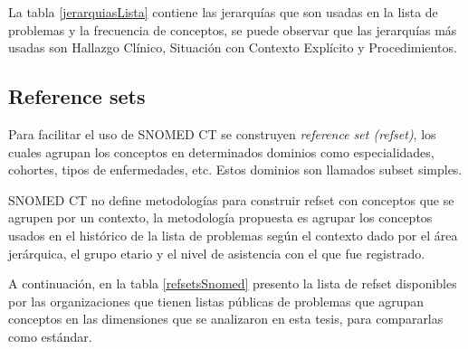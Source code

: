 La tabla \ref{jerarquiasLista} contiene las jerarquías que son usadas en la lista de problemas y la frecuencia de conceptos, se puede observar que las jerarquías más usadas son Hallazgo Clínico, Situación con Contexto Explícito y Procedimientos.

\begin{table}[htb]
\centering
\caption{Jerarquías de la lista de problemas}
\label{jerarquiasLista}
\end{table}

\subsection{Reference sets}
Para facilitar el uso de SNOMED CT se construyen \textit{reference set (refset)}, los cuales agrupan los conceptos en determinados dominios como especialidades, cohortes, tipos de enfermedades, etc. Estos dominios son llamados subset simples.

SNOMED CT no define metodologías para construir refset con conceptos que se agrupen por un contexto, la metodología propuesta es agrupar los conceptos usados en el histórico de la lista de problemas según el contexto dado por el área jerárquica, el grupo etario y el nivel de asistencia con el que fue registrado.

A continuación, en la tabla \ref{refsetsSnomed} presento la lista de refset disponibles por las organizaciones que tienen listas públicas de problemas que agrupan conceptos en las dimensiones que se analizaron en esta tesis, para compararlas como estándar.

